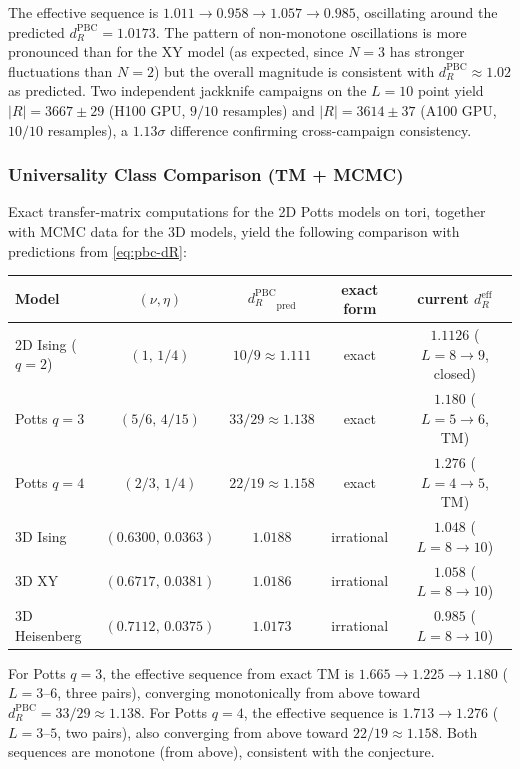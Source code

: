 \documentclass[11pt]{article}
\theoremstyle{definition}
\theoremstyle{remark}
\begin{document}
The effective sequence is $1.011 \to 0.958 \to 1.057 \to 0.985$,
oscillating around the predicted $d_R^{\mathrm{PBC}} = 1.0173$.
The pattern of non-monotone oscillations is more pronounced than for the
XY model (as expected, since $N = 3$ has stronger fluctuations than $N = 2$)
but the overall magnitude is consistent with $d_R^{\mathrm{PBC}} \approx 1.02$
as predicted. Two independent jackknife campaigns on the $L = 10$ point
yield $|R| = 3667 \pm 29$ (H100 GPU, $9/10$ resamples) and
$|R| = 3614 \pm 37$ (A100 GPU, $10/10$ resamples), a $1.13\sigma$ difference
confirming cross-campaign consistency.

\subsubsection{Universality Class Comparison (TM + MCMC)}

Exact transfer-matrix computations for the 2D Potts models
on tori, together with MCMC data for the 3D models,
yield the following comparison with predictions from \eqref{eq:pbc-dR}:

\begin{center}
\renewcommand{\arraystretch}{1.2}
\begin{tabular}{lcccc}
\toprule
Model & $(\nu, \eta)$ & ${d_R^{\mathrm{PBC}}}_{\text{pred}}$ & exact form & current $d_R^{\mathrm{eff}}$ \\
\midrule
2D Ising ($q=2$) & $(1,\, 1/4)$ & $10/9 \approx 1.111$ & exact & $1.1126$ ($L=8{\to}9$, closed) \\
Potts $q=3$ & $(5/6,\, 4/15)$ & $33/29 \approx 1.138$ & exact & $1.180$ ($L=5{\to}6$, TM) \\
Potts $q=4$ & $(2/3,\, 1/4)$ & $22/19 \approx 1.158$ & exact & $1.276$ ($L=4{\to}5$, TM) \\
3D Ising & $(0.6300,\, 0.0363)$ & $1.0188$ & irrational & $1.048$ ($L=8{\to}10$) \\
3D XY & $(0.6717,\, 0.0381)$ & $1.0186$ & irrational & $1.058$ ($L=8{\to}10$) \\
3D Heisenberg & $(0.7112,\, 0.0375)$ & $1.0173$ & irrational & $0.985$ ($L=8{\to}10$) \\
\bottomrule
\end{tabular}
\end{center}

For Potts $q = 3$, the effective sequence from exact TM is
$1.665 \to 1.225 \to 1.180$ ($L = 3$--$6$, three pairs),
converging monotonically from above toward
$d_R^{\mathrm{PBC}} = 33/29 \approx 1.138$.
For Potts $q = 4$, the effective sequence is $1.713 \to 1.276$
($L = 3$--$5$, two pairs), also
converging from above toward $22/19 \approx 1.158$.
Both sequences are monotone (from above), consistent with the conjecture.
\end{document}
